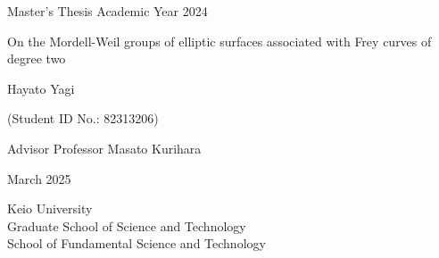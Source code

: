 \documentclass[main]{subfiles}
\begin{document}
\begin{titlepage}
    \fontsize{12pt}{12pt} \selectfont
    Master's Thesis \hspace{186pt} Academic Year 2024
    \vspace{20pt}

    \fontsize{30pt}{30pt} \selectfont
    
    \centering
    \vspace{20pt}
    On the Mordell-Weil groups of elliptic surfaces associated with Frey curves of degree two
    \vspace{45pt}
    
    Hayato Yagi
    \vspace{20pt}
    
    \fontsize{18pt}{18pt} \selectfont
    (Student ID No.: 82313206)
    \vspace{140pt}
    
    Advisor Professor Masato Kurihara
    \vspace{45pt}
    
    March 2025
    \vspace{45pt}
    
    Keio University \\
    Graduate School of Science and Technology \\
    School of Fundamental Science and Technology \\
    \normalsize
    
\end{titlepage}
\end{document}
